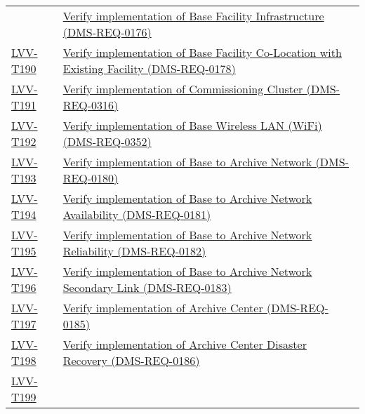\begin{longtable}[]{p{3cm}p{13cm}}
&
\href{https://jira.lsstcorp.org/secure/Tests.jspa\#/testCase/LVV-T189}{Verify
implementation of Base Facility Infrastructure
(DMS-REQ-0176)}\tabularnewline
\protect\hyperlink{lvv-t190---verify-implementation-of-base-facility-co-location-with-existing-facility-dms-req-0178}{LVV-T190}
&
\href{https://jira.lsstcorp.org/secure/Tests.jspa\#/testCase/LVV-T190}{Verify
implementation of Base Facility Co-Location with Existing Facility
(DMS-REQ-0178)}\tabularnewline
\protect\hyperlink{lvv-t191---verify-implementation-of-commissioning-cluster-dms-req-0316}{LVV-T191}
&
\href{https://jira.lsstcorp.org/secure/Tests.jspa\#/testCase/LVV-T191}{Verify
implementation of Commissioning Cluster (DMS-REQ-0316)}\tabularnewline
\protect\hyperlink{lvv-t192---verify-implementation-of-base-wireless-lan-wifi-dms-req-0352}{LVV-T192}
&
\href{https://jira.lsstcorp.org/secure/Tests.jspa\#/testCase/LVV-T192}{Verify
implementation of Base Wireless LAN (WiFi)
(DMS-REQ-0352)}\tabularnewline
\protect\hyperlink{lvv-t193---verify-implementation-of-base-to-archive-network-dms-req-0180}{LVV-T193}
&
\href{https://jira.lsstcorp.org/secure/Tests.jspa\#/testCase/LVV-T193}{Verify
implementation of Base to Archive Network (DMS-REQ-0180)}\tabularnewline
\protect\hyperlink{lvv-t194---verify-implementation-of-base-to-archive-network-availability-dms-req-0181}{LVV-T194}
&
\href{https://jira.lsstcorp.org/secure/Tests.jspa\#/testCase/LVV-T194}{Verify
implementation of Base to Archive Network Availability
(DMS-REQ-0181)}\tabularnewline
\protect\hyperlink{lvv-t195---verify-implementation-of-base-to-archive-network-reliability-dms-req-0182}{LVV-T195}
&
\href{https://jira.lsstcorp.org/secure/Tests.jspa\#/testCase/LVV-T195}{Verify
implementation of Base to Archive Network Reliability
(DMS-REQ-0182)}\tabularnewline
\protect\hyperlink{lvv-t196---verify-implementation-of-base-to-archive-network-secondary-link-dms-req-0183}{LVV-T196}
&
\href{https://jira.lsstcorp.org/secure/Tests.jspa\#/testCase/LVV-T196}{Verify
implementation of Base to Archive Network Secondary Link
(DMS-REQ-0183)}\tabularnewline
\protect\hyperlink{lvv-t197---verify-implementation-of-archive-center-dms-req-0185}{LVV-T197}
&
\href{https://jira.lsstcorp.org/secure/Tests.jspa\#/testCase/LVV-T197}{Verify
implementation of Archive Center (DMS-REQ-0185)}\tabularnewline
\protect\hyperlink{lvv-t198---verify-implementation-of--archive-center-disaster-recovery-dms-req-0186}{LVV-T198}
&
\href{https://jira.lsstcorp.org/secure/Tests.jspa\#/testCase/LVV-T198}{Verify
implementation of Archive Center Disaster Recovery
(DMS-REQ-0186)}\tabularnewline
\protect\hyperlink{lvv-t199---verify-implementation-of-archive-center-co-location-with-existing-facility-dms-req-0187}{LVV-T199}

\end{longtable}
